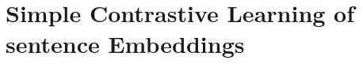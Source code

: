 \documentclass{report}
\begin{document}
\section{Simple Contrastive Learning of sentence Embeddings}
\end{document}
